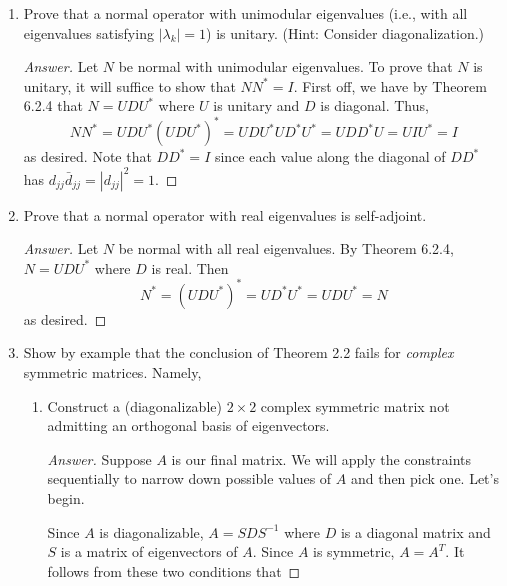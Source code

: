 \documentclass[../psets.tex]{subfiles}
\begin{document}
\begin{enumerate}[label={\textbf{2.\arabic*.}}]
\begin{proof}[Answer]
\begin{equation*}
\begin{pmatrix}
                1/\sqrt{2} & i/\sqrt{2}\\
                1/\sqrt{2} & -i/\sqrt{2}\\
            \end{pmatrix}
        \end{equation*}
    \end{proof}
    \setcounter{enumi}{12}
    \item Prove that a normal operator with unimodular eigenvalues (i.e., with all eigenvalues satisfying $|\lambda_k|=1$) is unitary. (Hint: Consider diagonalization.)
    \begin{proof}[Answer]
        Let $N$ be normal with unimodular eigenvalues. To prove that $N$ is unitary, it will suffice to show that $NN^*=I$. First off, we have by Theorem 6.2.4 that $N=UDU^*$ where $U$ is unitary and $D$ is diagonal. Thus,
        \begin{equation*}
            NN^* = UDU^*(UDU^*)^* = UDU^*UD^*U^* = UDD^*U = UIU^* = I
        \end{equation*}
        as desired. Note that $DD^*=I$ since each value along the diagonal of $DD^*$ has $d_{jj}\bar{d}_{jj}=|d_{jj}|^2=1$.
    \end{proof}
    \item Prove that a normal operator with real eigenvalues is self-adjoint.
    \begin{proof}[Answer]
        Let $N$ be normal with all real eigenvalues. By Theorem 6.2.4, $N=UDU^*$ where $D$ is real. Then
        \begin{equation*}
            N^* = (UDU^*)^* = UD^*U^* = UDU^* = N
        \end{equation*}
        as desired.
    \end{proof}
    \item Show by example that the conclusion of Theorem 2.2 fails for \emph{complex} symmetric matrices. Namely,
    \begin{enumerate}
        \item Construct a (diagonalizable) $2\times 2$ complex symmetric matrix not admitting an orthogonal basis of eigenvectors.
        \begin{proof}[Answer]
            Suppose $A$ is our final matrix. We will apply the constraints sequentially to narrow down possible values of $A$ and then pick one. Let's begin.\par
            Since $A$ is diagonalizable, $A=SDS^{-1}$ where $D$ is a diagonal matrix and $S$ is a matrix of eigenvectors of $A$. Since $A$ is symmetric, $A=A^T$. It follows from these two conditions that

\end{proof}
\end{enumerate}
\end{enumerate}
\end{document}
